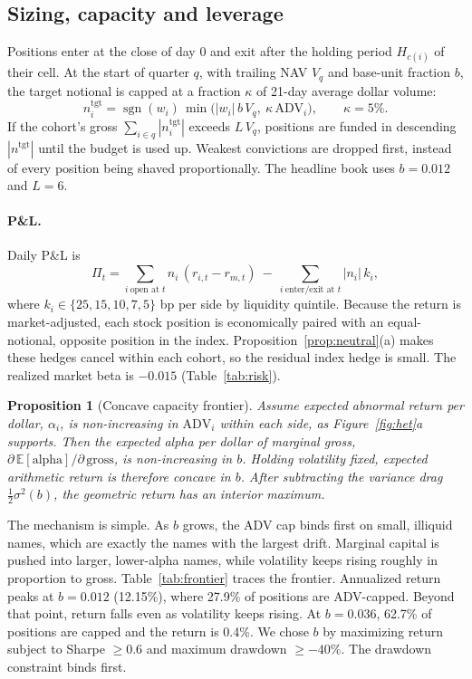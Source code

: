 \documentclass[11pt]{article}
\newtheorem{proposition}{Proposition}
\theoremstyle{definition}
\newcommand{\E}{\mathbb{E}}
\newcommand{\sgn}{\operatorname{sgn}}
\newcommand{\1}{\mathbf{1}}
\begin{document}
\subsection{Sizing, capacity and leverage}

Positions enter at the close of day 0 and exit after the holding period $H_{c(i)}$ of their
cell. At the start of quarter $q$, with trailing NAV $V_q$ and base-unit fraction $b$, the
target notional is capped at a fraction $\kappa$ of 21-day average dollar volume:
\begin{equation}
  n_i^{\text{tgt}}=\sgn(w_i)\,\min\!\big(|w_i|\,b\,V_q,\ \kappa\,\mathrm{ADV}_i\big),\qquad \kappa=5\%.
  \label{eq:notional}
\end{equation}
If the cohort's gross $\sum_{i\in q}|n_i^{\text{tgt}}|$ exceeds $L\,V_q$, positions are
funded in descending $|n^{\text{tgt}}|$ until the budget is used up. Weakest convictions are
dropped first, instead of every position being shaved proportionally. The headline book
uses $b=0.012$ and $L=6$.

\paragraph{P\&L.} Daily P\&L is
\begin{equation}
  \Pi_t=\sum_{i\ \text{open at } t} n_i\,(r_{i,t}-r_{m,t})\ -\ \sum_{i\ \text{enter/exit at } t}|n_i|\,k_i,
  \label{eq:pnl}
\end{equation}
where $k_i\in\{25,15,10,7,5\}$ bp per side by liquidity quintile. Because the return is
market-adjusted, each stock position is economically paired with an equal-notional,
opposite position in the index. Proposition~\ref{prop:neutral}(a) makes these hedges cancel
within each cohort, so the residual index hedge is small. The realized market beta is
$-0.015$ (Table~\ref{tab:risk}).

\begin{proposition}[Concave capacity frontier]\label{prop:capacity}
Assume expected abnormal return per dollar, $\alpha_i$, is non-increasing in $\mathrm{ADV}_i$
within each side, as Figure~\ref{fig:het}a supports. Then the expected alpha per dollar of
\emph{marginal} gross, $\partial\,\E[\text{alpha}]/\partial\,\text{gross}$, is non-increasing in
$b$. Holding volatility fixed, expected arithmetic return is therefore concave in $b$. After
subtracting the variance drag $\tfrac12\sigma^2(b)$, the geometric return has an interior
maximum.
\end{proposition}
\noindent The mechanism is simple. As $b$ grows, the ADV cap binds first on small, illiquid
names, which are exactly the names with the largest drift. Marginal capital is pushed into
larger, lower-alpha names, while volatility keeps rising roughly in proportion to gross.
Table~\ref{tab:frontier} traces the frontier. Annualized return peaks at $b=0.012$ (12.15\%),
where 27.9\% of positions are ADV-capped. Beyond that point, return falls even as
volatility keeps rising. At $b=0.036$, 62.7\% of positions are capped and the return is
0.4\%. We chose $b$ by maximizing return subject to Sharpe $\ge 0.6$ and maximum drawdown
$\ge -40\%$. The drawdown constraint binds first.
\end{document}
